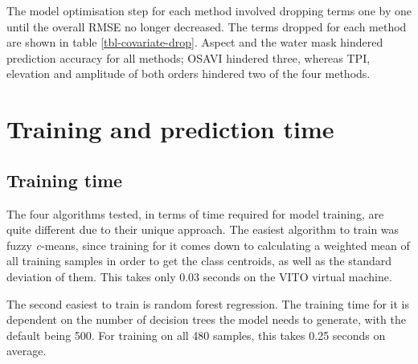 \documentclass[a4paper,12pt]{scrbook}
\begin{document}
The model optimisation step for each method involved dropping terms one by one until the overall RMSE no longer decreased. The terms dropped for each method are shown in table \ref{tbl-covariate-drop}. Aspect and the water mask hindered prediction accuracy for all methods; OSAVI hindered three, whereas TPI, elevation and amplitude of both orders hindered two of the four methods.

\begin{table}
  \centering
  \caption{Covariates dropped in the model optimisation step for each method.}
  \label{tbl-covariate-drop}
\end{table}


\section{Training and prediction time}

\subsection{Training time}

The four algorithms tested, in terms of time required for model training, are quite different due to their unique approach. The easiest algorithm to train was fuzzy \textit{c}-means, since training for it comes down to calculating a weighted mean of all training samples in order to get the class centroids, as well as the standard deviation of them. This takes only 0.03 seconds on the VITO virtual machine.

The second easiest to train is random forest regression. The training time for it is dependent on the number of decision trees the model needs to generate, with the default being 500. For training on all 480 samples, this takes 0.25 seconds on average.
\end{document}

